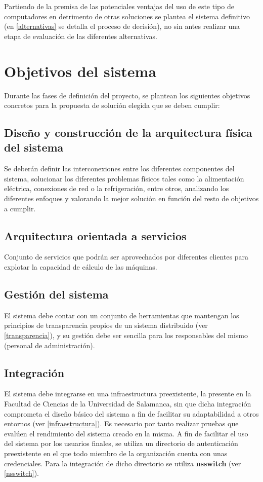 Partiendo de la premisa de las potenciales ventajas del uso de este tipo de computadores en detrimento de otras soluciones se plantea el sistema definitivo (en \ref{alternativas} se detalla el proceso de decisión), no sin antes realizar una etapa de evaluación de las diferentes alternativas.

\section{Objetivos del sistema}

Durante las fases de definición del proyecto, se plantean los siguientes objetivos concretos para la propuesta de solución elegida que se deben cumplir:

\subsection{Diseño y construcción de la arquitectura física del sistema}

Se deberán definir las interconexiones entre los diferentes componentes del sistema, solucionar los diferentes problemas físicos tales como la alimentación eléctrica, conexiones de red o la refrigeración, entre otros, analizando los diferentes enfoques y valorando la mejor solución en función del resto de objetivos a cumplir.

\subsection{Arquitectura orientada a servicios}
Conjunto de servicios que podrán ser aprovechados por diferentes clientes para explotar la capacidad de cálculo de las máquinas.

\subsection{Gestión del sistema}

El sistema debe contar con un conjunto de herramientas que mantengan los principios de transparencia propios de un sistema distribuido (ver \ref{transparencia}), y su gestión debe ser sencilla para los responsables del mismo (personal de administración).

\subsection{Integración}

El sistema debe integrarse en una infraestructura preexistente, la presente en la Facultad de Ciencias de la Universidad de Salamanca, sin que dicha integración comprometa el diseño básico del sistema a fin de facilitar su adaptabilidad a otros entornos (ver \ref{infraestructura}). Es necesario por tanto realizar pruebas que evalúen el rendimiento del sistema creado en la misma. %
A fin de facilitar el uso del sistema por los usuarios finales, se utiliza un directorio de autenticación preexistente en el que todo miembro de la organización cuenta con unas credenciales. Para la integración de dicho directorio se utiliza \textbf{nsswitch} (ver \ref{nsswitch}). 

